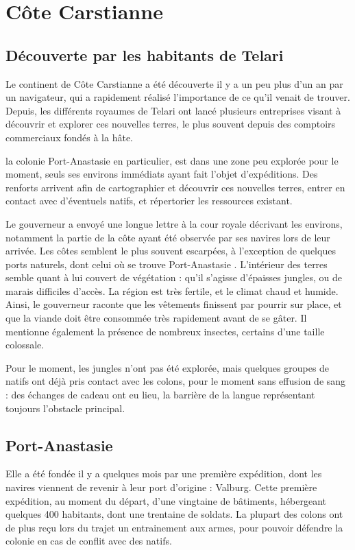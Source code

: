 \documentclass[10pt,a4paper]{book}
\title{\nomregion}
\author{ Antoine Robin}
\newcommand{\nomregion}{Côte Carstianne }
\newcommand{\nomcolonie}{Port-Anastasie }
\newcommand{\nomorigine}{Telari }
\begin{document}
\maketitle
\tableofcontents
\chapter{\nomregion}
\section{Découverte par les habitants de \nomorigine}
Le continent de \nomregion a été découverte il y a un peu plus d'un an par un navigateur, qui a rapidement réalisé l'importance de ce qu'il venait de trouver. Depuis, les différents royaumes de \nomorigine ont lancé plusieurs entreprises visant à découvrir et explorer ces nouvelles terres, le plus souvent depuis des comptoirs commerciaux fondés à la hâte.

la colonie \nomcolonie en particulier, est dans une zone peu explorée pour le moment, seuls ses environs immédiats ayant fait l'objet d'expéditions. Des renforts arrivent afin de cartographier et découvrir ces nouvelles terres, entrer en contact avec d'éventuels natifs, et répertorier les ressources existant.

Le gouverneur a envoyé une longue lettre à la cour royale décrivant les environs, notamment la partie de la côte ayant été observée par ses navires lors de leur arrivée. Les côtes semblent le plus souvent escarpées, à l'exception de quelques ports naturels, dont celui où se trouve \nomcolonie. L'intérieur des terres semble quant à lui couvert de végétation : qu'il s'agisse d'épaisses jungles, ou de marais difficiles d'accès. La région est très fertile, et le climat chaud et humide. Ainsi, le gouverneur raconte que les vêtements finissent par pourrir sur place, et que la viande doit être consommée très rapidement avant de se gâter. Il mentionne également la présence de nombreux insectes, certains d'une taille colossale.

Pour le moment, les jungles n'ont pas été explorée, mais quelques groupes de natifs ont déjà pris contact avec les colons, pour le moment sans effusion de sang : des échanges de cadeau ont eu lieu, la barrière de la langue représentant toujours l'obstacle principal.
\section{\nomcolonie}
Elle a été fondée il y a quelques mois par une première expédition, dont les navires viennent de revenir à leur port d'origine :  Valburg. Cette première expédition, au moment du départ, d'une vingtaine de bâtiments, hébergeant quelques 400 habitants, dont une trentaine de soldats. La plupart des colons ont de plus reçu lors du trajet un entrainement aux armes, pour pouvoir défendre la colonie en cas de conflit avec des natifs.
\end{document}
